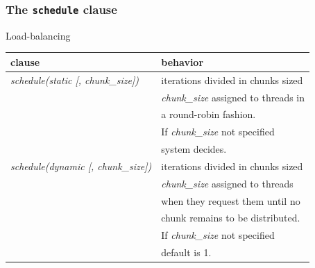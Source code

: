 \begin{frame}[containsverbatim]
\frametitle{The \texttt{schedule} clause}

\begin{block}{}
Load-balancing
\end{block}

\begin{center}
\begin{tabular}{|l|l|}
\hline
  \textbf{clause} & \textbf{behavior}  \\
\hline
\hline
\textit{schedule(static [, chunk\_size])} &
iterations divided in chunks sized \\
& \textit{chunk\_size} assigned to threads in \\
& a round-robin fashion.  \\
& If \textit{chunk\_size} not specified \\
& system decides. \\
\hline

\textit{schedule(dynamic [, chunk\_size])} &
iterations divided in chunks sized \\
& \textit{chunk\_size} assigned to threads \\
& when they request them until no \\
& chunk remains to be distributed. \\
& If \textit{chunk\_size} not specified \\
& default is 1. \\

\hline
\end{tabular}
\end{center}

\end{frame}


